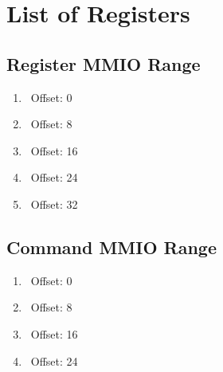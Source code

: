 \section{List of Registers}

\subsection{Register MMIO Range}
\begin{enumerate}
    \item \iommucap\ Offset: 0
    \item \rsiddiv\ Offset: 8
    \item \ersiddiv\ Offset: 16
    \item \dtbase\ Offset: 24
    \item \ftval\ Offset: 32
\end{enumerate}

\subsection{Command MMIO Range}

\begin{enumerate}
    \item \iommucapen\ Offset: 0
    \item \iommuinten\ Offset: 8
    \item \invltlb\ Offset: 16
    \item \resume\ Offset: 24
\end{enumerate}

